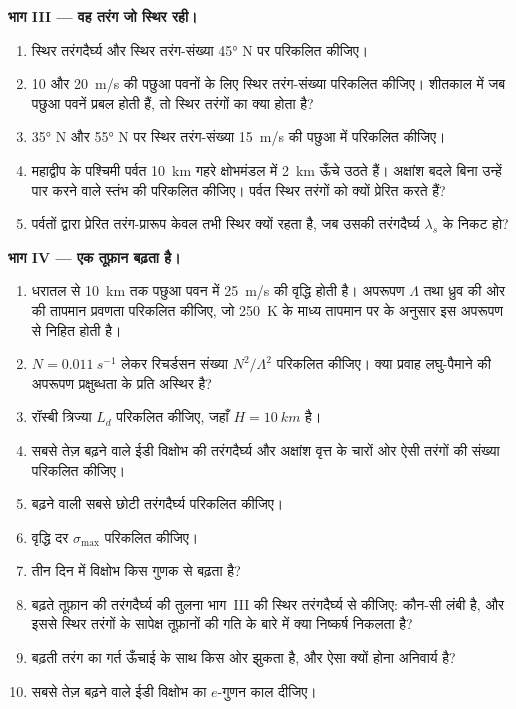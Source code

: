 \begin{problem}
\medskip\noindent\textbf{भाग III --- वह तरंग जो स्थिर रही।}
\begin{enumerate}[resume]
\item स्थिर तरंगदैर्घ्य और स्थिर तरंग-संख्या
  \ang{45} N पर परिकलित कीजिए।
\item 10 और
  \qty{20}{m/s} की पछुआ पवनों के लिए स्थिर तरंग-संख्या परिकलित कीजिए। शीतकाल में जब
  पछुआ पवनें प्रबल होती हैं, तो स्थिर तरंगों का क्या होता है?
\item \ang{35} N और \ang{55} N पर स्थिर तरंग-संख्या
  \qty{15}{m/s} की पछुआ में परिकलित कीजिए।
\item महाद्वीप के पश्चिमी पर्वत \qty{10}{km} गहरे क्षोभमंडल में
  \qty{2}{km} ऊँचे उठते हैं। अक्षांश बदले बिना उन्हें पार करने वाले स्तंभ की
   परिकलित कीजिए। पर्वत स्थिर तरंगों को क्यों
  प्रेरित करते हैं?
\item पर्वतों द्वारा प्रेरित तरंग-प्रारूप केवल तभी स्थिर क्यों रहता है,
  जब उसकी तरंगदैर्घ्य $\lambda_s$ के निकट हो?
\end{enumerate}

\medskip\noindent\textbf{भाग IV --- एक तूफ़ान बढ़ता है।}
\begin{enumerate}[resume]
\item धरातल से \qty{10}{km} तक पछुआ पवन में
  \qty{25}{m/s} की वृद्धि होती है। अपरूपण $\Lambda$ तथा ध्रुव की ओर की तापमान
  प्रवणता परिकलित कीजिए, जो \qty{250}{K} के माध्य तापमान पर  के
  अनुसार इस अपरूपण से निहित होती है।
\item $N = \qty{0.011}{s^{-1}}$ लेकर रिचर्डसन संख्या
  $N^2/\Lambda^2$ परिकलित कीजिए। क्या प्रवाह लघु-पैमाने की अपरूपण प्रक्षुब्धता के प्रति अस्थिर है?
\item रॉस्बी त्रिज्या $L_d$ परिकलित कीजिए, जहाँ $H = \qty{10}{km}$ है।
\item सबसे तेज़ बढ़ने वाले ईडी विक्षोभ की तरंगदैर्घ्य
  और अक्षांश वृत्त के चारों ओर ऐसी तरंगों की संख्या परिकलित कीजिए।
\item बढ़ने वाली सबसे छोटी तरंगदैर्घ्य परिकलित कीजिए।
\item वृद्धि दर $\sigma_{\max}$ परिकलित कीजिए।
\item तीन दिन में विक्षोभ किस गुणक से बढ़ता है?
\item बढ़ते तूफ़ान की तरंगदैर्घ्य की तुलना भाग~III की स्थिर
  तरंगदैर्घ्य से कीजिए: कौन-सी लंबी है, और इससे स्थिर तरंगों के सापेक्ष तूफ़ानों की
  गति के बारे में क्या निष्कर्ष निकलता है?
\item बढ़ती तरंग का गर्त ऊँचाई के साथ किस ओर झुकता है,
  और ऐसा क्यों होना अनिवार्य है?
\item सबसे तेज़ बढ़ने वाले ईडी विक्षोभ का $e$-गुणन काल दीजिए।
\end{enumerate}
\end{problem}
